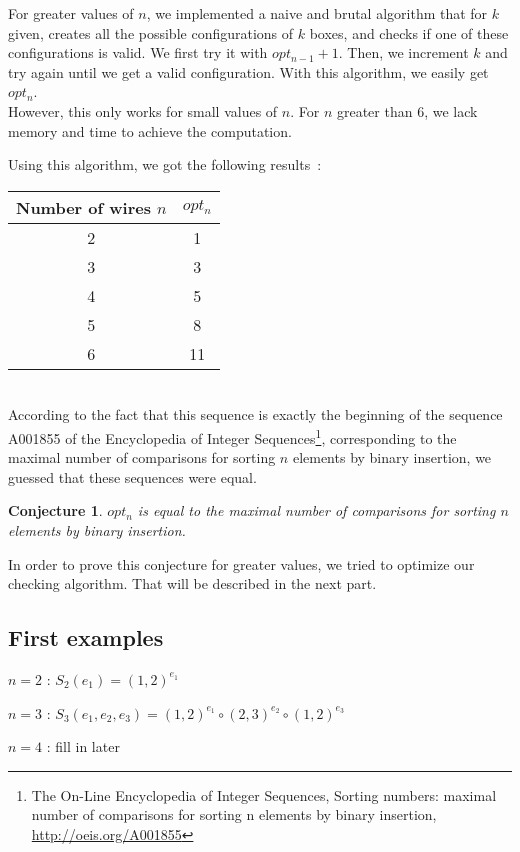 \documentclass[11pt, a4paper]{article}
\newtheorem*{Conj*}{Conjecture}
\begin{document}
For greater values of $n$, we implemented a naive and brutal algorithm that for
$k$ given, creates all the possible configurations of $k$ boxes, and checks if
one of these configurations is valid. We first try it with $opt_{n-1}+1$. Then,
we increment $k$ and try again until we get a valid configuration.  With this
algorithm, we easily get $opt_n$.\\
However, this only works for small values of $n$. For $n$ greater than 6, we
lack memory and time to achieve the computation.

Using this algorithm, we got the following results~:

\begin{tabular}{|c|c|}
\hline
Number of wires $n$ & $opt_n$ \\
\hline
2 & 1 \\
3 & 3 \\
4 & 5 \\
5 & 8 \\
6 & 11 \\
\hline
\end{tabular}\\

According to the fact that this sequence is exactly the beginning of the
sequence A001855 of the Encyclopedia of Integer Sequences\footnote{The On-Line
Encyclopedia of Integer Sequences, Sorting numbers: maximal number of
comparisons for sorting n elements by binary insertion,
\url{http://oeis.org/A001855}}, corresponding to the maximal number of
comparisons for sorting $n$ elements by binary insertion, we guessed that these
sequences were equal.

\Large
\begin{Conj*}
$opt_n$ is equal to the maximal number of comparisons for sorting $n$ elements
by binary insertion.
\end{Conj*}
\normalsize

In order to prove this conjecture for greater values, we tried to optimize our
checking algorithm. That will be described in the next part.

\subsection{First examples}

$n=2$ : $S_2(e_1) = (1,2)^{e_1}$

$n=3$ : $S_3(e_1,e_2,e_3) = (1,2)^{e_1} \circ (2,3)^{e_2} \circ (1,2)^{e_3}$

$n=4$ : fill in later
\end{document}
